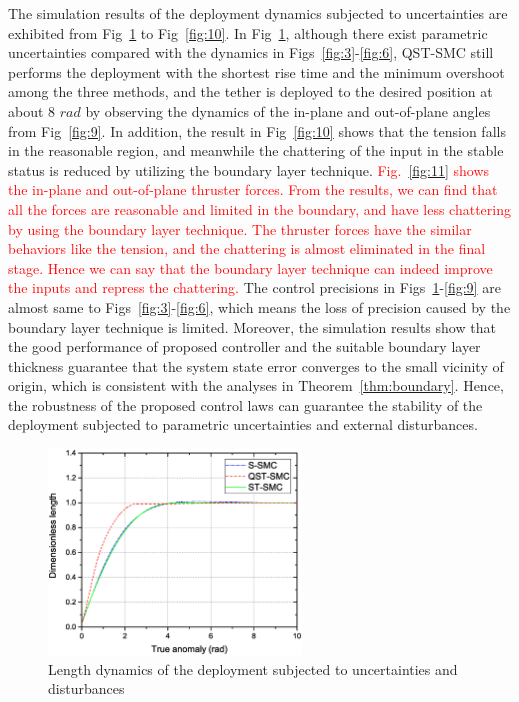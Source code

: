 \documentclass[3p]{elsarticle}
\theoremstyle{plain}
\theoremstyle{remark}
\begin{document}
The simulation results of the deployment dynamics subjected to uncertainties are exhibited from Fig~\ref{fig:7} to Fig~\ref{fig:10}. In Fig~\ref{fig:7}, although there exist parametric uncertainties compared with the dynamics in Figs~\ref{fig:3}-\ref{fig:6}, QST-SMC still performs the deployment with the shortest rise time and the minimum overshoot among the three methods, and the tether is deployed to the desired position at about 8 $rad$ by observing the dynamics of the in-plane and out-of-plane angles from Fig~\ref{fig:9}. In addition, the result in Fig~\ref{fig:10} shows that the tension falls in the reasonable region, and meanwhile the chattering of the input in the stable status is reduced by utilizing the boundary layer technique. \textcolor{red}{Fig.~\ref{fig:11} shows the in-plane and out-of-plane thruster forces. From the results, we can find that all the forces are reasonable and limited in the boundary, and have less chattering by using the boundary layer technique. The thruster forces have the similar behaviors like the tension, and the chattering is almost eliminated in the final stage. Hence we can say that the boundary layer technique can indeed improve the inputs and repress the chattering.} The control precisions in Figs~\ref{fig:7}-\ref{fig:9} are almost same to Figs~\ref{fig:3}-\ref{fig:6}, which means the loss of precision caused by the boundary layer technique is limited. Moreover, the simulation results show that the good performance of proposed controller and the suitable boundary layer thickness guarantee that the system state error converges to the small vicinity of origin, which is consistent with the analyses in Theorem~\ref{thm:boundary}. Hence, the robustness of the proposed control laws can guarantee the stability of the deployment subjected to parametric uncertainties and external disturbances.
\begin{figure}
\centering
\includegraphics[width=0.6\textwidth]{paper4_fig7_20161025.eps}
\caption{Length dynamics of the deployment subjected to uncertainties and disturbances}
\label{fig:7}
\end{figure}
\end{document}
